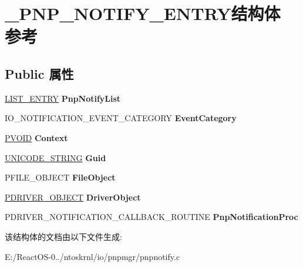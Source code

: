 \hypertarget{struct___p_n_p___n_o_t_i_f_y___e_n_t_r_y}{}\section{\+\_\+\+P\+N\+P\+\_\+\+N\+O\+T\+I\+F\+Y\+\_\+\+E\+N\+T\+R\+Y结构体 参考}
\label{struct___p_n_p___n_o_t_i_f_y___e_n_t_r_y}
\subsection*{Public 属性}
\begin{DoxyCompactItemize}
\item 
\mbox{\label{struct___p_n_p___n_o_t_i_f_y___e_n_t_r_y_a7ef548f5f7adf165a9629a78115f4d6c}} 
\hyperlink{struct___l_i_s_t___e_n_t_r_y}{L\+I\+S\+T\+\_\+\+E\+N\+T\+RY} {\bfseries Pnp\+Notify\+List}
\item 
\mbox{\label{struct___p_n_p___n_o_t_i_f_y___e_n_t_r_y_a0a1e3246d346ca44fbb4578c3f03afbd}} 
I\+O\+\_\+\+N\+O\+T\+I\+F\+I\+C\+A\+T\+I\+O\+N\+\_\+\+E\+V\+E\+N\+T\+\_\+\+C\+A\+T\+E\+G\+O\+RY {\bfseries Event\+Category}
\item 
\mbox{\label{struct___p_n_p___n_o_t_i_f_y___e_n_t_r_y_a96fa5849566024ec10f0d7e319a60d53}} 
\hyperlink{interfacevoid}{P\+V\+O\+ID} {\bfseries Context}
\item 
\mbox{\label{struct___p_n_p___n_o_t_i_f_y___e_n_t_r_y_ae17d3f3628cec2cc5a6b0df1d7780e79}} 
\hyperlink{struct___u_n_i_c_o_d_e___s_t_r_i_n_g}{U\+N\+I\+C\+O\+D\+E\+\_\+\+S\+T\+R\+I\+NG} {\bfseries Guid}
\item 
\mbox{\label{struct___p_n_p___n_o_t_i_f_y___e_n_t_r_y_aee5af9efafb597b09098850a5bc4ef1f}} 
P\+F\+I\+L\+E\+\_\+\+O\+B\+J\+E\+CT {\bfseries File\+Object}
\item 
\mbox{\label{struct___p_n_p___n_o_t_i_f_y___e_n_t_r_y_a046ee144deb264bd9abcb808ffc36785}} 
\hyperlink{struct___d_r_i_v_e_r___o_b_j_e_c_t}{P\+D\+R\+I\+V\+E\+R\+\_\+\+O\+B\+J\+E\+CT} {\bfseries Driver\+Object}
\item 
\mbox{\label{struct___p_n_p___n_o_t_i_f_y___e_n_t_r_y_a6914ddaef925083b0ec85d6c1242ef8a}} 
P\+D\+R\+I\+V\+E\+R\+\_\+\+N\+O\+T\+I\+F\+I\+C\+A\+T\+I\+O\+N\+\_\+\+C\+A\+L\+L\+B\+A\+C\+K\+\_\+\+R\+O\+U\+T\+I\+NE {\bfseries Pnp\+Notification\+Proc}
\end{DoxyCompactItemize}


该结构体的文档由以下文件生成\+:\begin{DoxyCompactItemize}
\item 
E\+:/\+React\+O\+S-\/0../ntoskrnl/io/pnpmgr/pnpnotify.\+c\end{DoxyCompactItemize}
